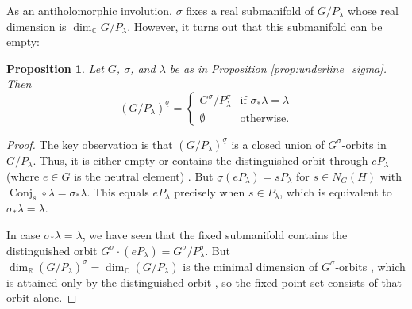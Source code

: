 \documentclass{amsart}
\newcommand{\C}{\mathbb{C}}
\newcommand{\Conj}{\operatorname{Conj}}
\newcommand{\R}{\mathbb{R}}
\theoremstyle{definition}
\theoremstyle{plain}
\newtheorem{prop}[defn]{Proposition}
\theoremstyle{remark}
\begin{document}
As an antiholomorphic involution, $\underline{\sigma}$ fixes a real submanifold of $G/P_\lambda$ whose real dimension is $\dim_\C G/P_\lambda$. However, it turns out that this submanifold can be empty:
\begin{prop}
Let $G$, $\sigma$, and $\lambda$ be as in Proposition \ref{prop:underline_sigma}. Then
    $$
        (G/P_\lambda)^{\underline{\sigma}}
        =
        \begin{cases}
            G^\sigma/P_\lambda^\sigma
                & \text{if } \sigma_*\lambda = \lambda \\
            \emptyset
                & \text{otherwise.}
        \end{cases}
    $$
\end{prop}
\begin{proof}
    The key observation is that $(G/P_\lambda)^{\underline{\sigma}}$ is a closed union of $G^\sigma$-orbits in $G/P_\lambda$. Thus, it is either empty or contains the distinguished orbit through $eP_\lambda$ (where $e\in G$ is the neutral element) \cite[Cor.\,3.4]{Wolf1969_real_action}. But $\underline{\sigma}(eP_\lambda) = sP_\lambda$ for $s\in N_G(H)$ with $\Conj_s\circ \lambda = \sigma_*\lambda$. This equals $eP_\lambda$ precisely when $s\in P_\lambda$, which is equivalent to $\sigma_*\lambda = \lambda$. 
    
    In case $\sigma_*\lambda = \lambda$, we have seen that the fixed submanifold contains the distinguished orbit $G^\sigma\cdot (eP_\lambda) = G^\sigma/P_\lambda^\sigma$. But $\dim_\R(G/P_\lambda)^{\underline{\sigma}} = \dim_\C (G/P_\lambda)$ is the minimal dimension of $G^\sigma$-orbits \cite[Thm.\,3.6]{Wolf1969_real_action}, which is attained only by the distinguished orbit \cite[Cor.\,3.4]{Wolf1969_real_action}, so the fixed point set consists of that orbit alone.
\end{proof}
\end{document}

